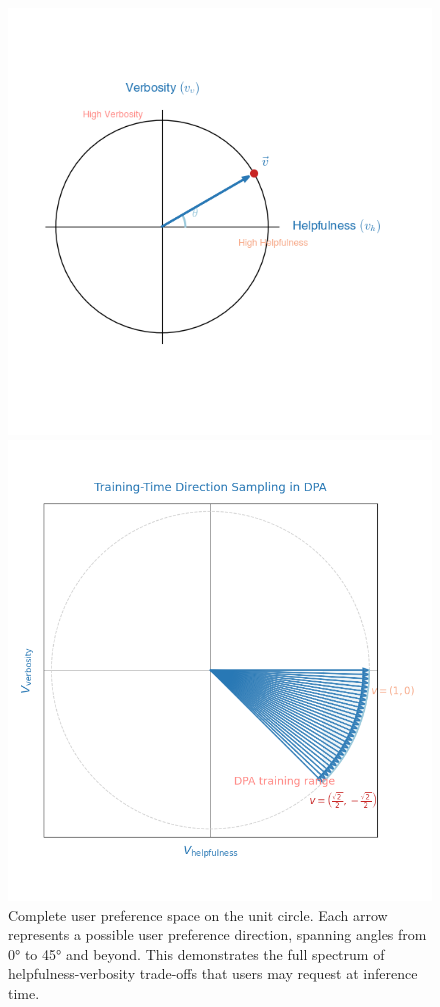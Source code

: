 \documentclass{article} %
\begin{document}
\begin{figure}[t]
\centering
\begin{minipage}[t]{0.48\textwidth}
\centering
\includegraphics[width=\textwidth]{unit_circle.png}
\caption{Complete user preference space on the unit circle. Each arrow represents a possible user preference direction, spanning angles from 0° to 45° and beyond. This demonstrates the full spectrum of helpfulness-verbosity trade-offs that users may request at inference time.}
\label{fig:unit_circle}
\end{minipage}
\hfill
\begin{minipage}[t]{0.48\textwidth}
\centering
\includegraphics[width=\textwidth]{dpa_training_range_new.png}

\end{minipage}
\end{figure}
\end{document}
